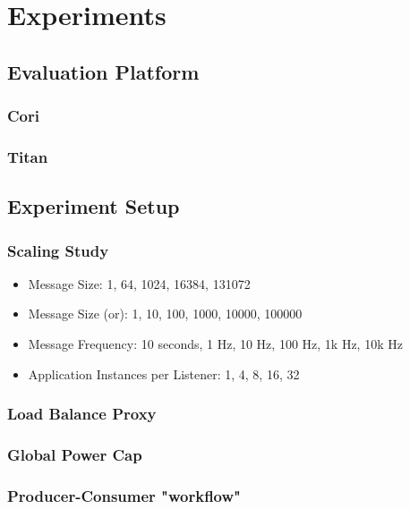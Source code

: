 \section{Experiments}
\subsection{Evaluation Platform} %

%
%

\subsubsection{Cori}

\subsubsection{Titan}

\subsection{Experiment Setup} %
%

\subsubsection{Scaling Study}
\begin{itemize}
\item Message Size: 1, 64, 1024, 16384, 131072
\item Message Size (or): 1, 10, 100, 1000, 10000, 100000
\item Message Frequency: 10 seconds, 1 Hz, 10 Hz, 100 Hz, 1k Hz, 10k Hz
\item Application Instances per Listener: 1, 4, 8, 16, 32
\end{itemize}

\subsubsection{Load Balance Proxy}

\subsubsection{Global Power Cap}

\subsubsection{Producer-Consumer "workflow"}

%
